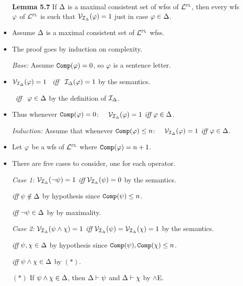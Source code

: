 \documentclass[a4paper, 11pt]{article} %
\begin{document}
\begin{itemize}
  \item[\bf Lemma 5.7] If $\Delta$ is a maximal consistent set of wfss of $\mathcal{L}^{\textsc{pl}}$, then every wfs $\varphi$ of $\mathcal{L}^{\textsc{pl}}$ is such that $\mathcal{V}_{\mathcal{I}_{\Delta}}(\varphi) = 1$ just in case $\varphi\in\Delta$.  
    \item Assume $\Delta$ is a maximal consistent set of $\mathcal{L}^{\textsc{pl}}$ wfss.
    \item The proof goes by induction on complexity.
    \item[\it Base:] Assume $\texttt{Comp}(\varphi)=0$, so $\varphi$ is a sentence letter.
      \item $\mathcal{V}_{\mathcal{I}_{\Delta}}(\varphi)=1$ ~\textit{iff}~ $\mathcal{I}_{\Delta}(\varphi) = 1$ by the semantics.
      \item[] \hspace{.75in} ~\textit{iff}~ $\varphi \in \Delta$ by the definition of $\mathcal{I}_{\Delta}$.
      \item Thus whenever $\texttt{Comp}(\varphi) = 0$:~~ $\mathcal{V}_{\mathcal{I}_{\Delta}}(\varphi) = 1$ \textit{iff} $\varphi\in\Delta$.
    \item[\it Induction:] Assume that whenever $\texttt{Comp}(\varphi)\leq n$:~~ $\mathcal{V}_{\mathcal{I}_\Delta}(\varphi)=1$ \textit{iff} $\varphi\in\Delta$.
    \item Let $\varphi$ be a wfs of $\mathcal{L}^{\textsc{pl}}$ where $\texttt{Comp}(\varphi)=n+1$.
    \item There are five cases to consider, one for each operator.
    \item[\it Case 1:] $\mathcal{V}_{\mathcal{I}_\Delta}(\neg\psi)=1$ \textit{iff} $\mathcal{V}_{\mathcal{I}_\Delta}(\psi) = 0$ by the semantics. 
      \item[] \hspace{.86in} \textit{iff} $\psi\notin\Delta$ by hypothesis since $\texttt{Comp}(\psi) \leq n$.
      \item[] \hspace{.86in} \textit{iff} $\neg\psi\in\Delta$ by by maximality.
    \item[\it Case 2:] $\mathcal{V}_{\mathcal{I}_\Delta}(\psi\wedge\chi)=1$ \textit{iff} $\mathcal{V}_{\mathcal{I}_\Delta}(\psi)=\mathcal{V}_{\mathcal{I}_\Delta}(\chi)=1$ by the semantics.     
      \item[] \hspace{1.02in} \textit{iff} $\psi,\chi\in\Delta$ by hypothesis since $\texttt{Comp}(\psi), \texttt{Comp}(\chi) \leq n$.
      \item[] \hspace{1.02in} \textit{iff} $\psi\wedge\chi\in\Delta$ by $(*)$.
      \item[$(*)$] If $\psi\wedge\chi\in\Delta$, then $\Delta \vdash \psi$ and $\Delta \vdash \chi$ by $\wedge$E. 

\end{itemize}
\end{document}
